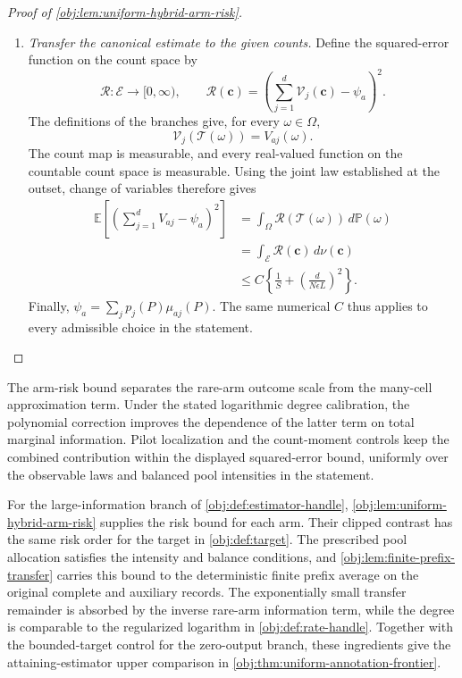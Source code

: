 \documentclass[11pt]{article}
\begin{document}
\begin{proof}[Proof of \cref{obj:lem:uniform-hybrid-arm-risk}]
\begin{enumerate}
\item \textit{Transfer the canonical estimate to the given counts.}
Define the squared-error function on the count space by
\[
\mathcal R:\mathcal E\longrightarrow[0,\infty),
\qquad
\mathcal R(\boldsymbol c)
=
\left(
\sum_{j=1}^d\mathcal V_j(\boldsymbol c)-\psi_a
\right)^2.
\]
The definitions of the branches give, for every \(\omega\in\Omega\),
\[
\mathcal V_j(\mathscr T(\omega))=V_{aj}(\omega).
\]
The count map is measurable, and every real-valued function on the countable count space is measurable. Using the joint law established at the outset, change of variables therefore gives
\[
\begin{aligned}
\mathbb E\left[
\left(\sum_{j=1}^dV_{aj}-\psi_a\right)^2
\right]
&=
\int_\Omega\mathcal R(\mathscr T(\omega))\,d\mathbb P(\omega)\\
&=
\int_{\mathcal E}\mathcal R(\boldsymbol c)\,d\nu(\boldsymbol c)\\
&\le
C\left\{
\frac1S+\left(\frac{d}{N\epsilon L}\right)^2
\right\}.
\end{aligned}
\]
Finally, \(\psi_a=\sum_jp_j(P)\mu_{aj}(P)\). The same numerical \(C\) thus applies to every admissible choice in the statement.
\end{enumerate}
\end{proof}

The arm-risk bound separates the rare-arm outcome scale from the many-cell approximation term. Under the stated logarithmic degree calibration, the polynomial correction improves the dependence of the latter term on total marginal information. Pilot localization and the count-moment controls keep the combined contribution within the displayed squared-error bound, uniformly over the observable laws and balanced pool intensities in the statement.

For the large-information branch of \cref{obj:def:estimator-handle}, \cref{obj:lem:uniform-hybrid-arm-risk} supplies the risk bound for each arm. Their clipped contrast has the same risk order for the target in \cref{obj:def:target}. The prescribed pool allocation satisfies the intensity and balance conditions, and \cref{obj:lem:finite-prefix-transfer} carries this bound to the deterministic finite prefix average on the original complete and auxiliary records. The exponentially small transfer remainder is absorbed by the inverse rare-arm information term, while the degree is comparable to the regularized logarithm in \cref{obj:def:rate-handle}. Together with the bounded-target control for the zero-output branch, these ingredients give the attaining-estimator upper comparison in \cref{obj:thm:uniform-annotation-frontier}.
\end{document}

